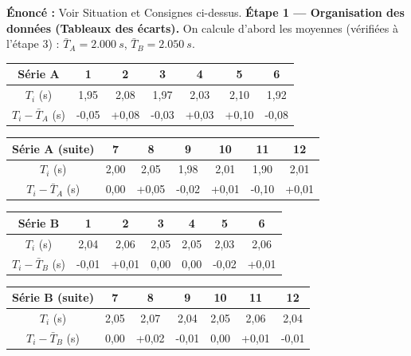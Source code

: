 \documentclass[11pt]{article}
\begin{document}
\begin{exoresolu}
\textbf{Énoncé :} Voir Situation et Consignes ci-dessus.
\tcblower
\textbf{Étape 1 — Organisation des données (Tableaux des écarts).}
On calcule d'abord les moyennes (vérifiées à l'étape 3) : $\bar{T}_A = \SI{2,000}{s}$, $\bar{T}_B = \SI{2,050}{s}$.

\begin{center}
\begin{tabular}{|c|*{6}{c|}}\hline
\rowcolor{popblueL} Série A & 1 & 2 & 3 & 4 & 5 & 6 \\ \hline
$T_i$ (s) & 1,95 & 2,08 & 1,97 & 2,03 & 2,10 & 1,92 \\ \hline
$T_i - \bar{T}_A$ (s) & -0,05 & +0,08 & -0,03 & +0,03 & +0,10 & -0,08 \\ \hline
\end{tabular}
\end{center}
\begin{center}
\begin{tabular}{|c|*{6}{c|}}\hline
\rowcolor{popblueL} Série A (suite) & 7 & 8 & 9 & 10 & 11 & 12 \\ \hline
$T_i$ (s) & 2,00 & 2,05 & 1,98 & 2,01 & 1,90 & 2,01 \\ \hline
$T_i - \bar{T}_A$ (s) & 0,00 & +0,05 & -0,02 & +0,01 & -0,10 & +0,01 \\ \hline
\end{tabular}
\end{center}

\begin{center}
\begin{tabular}{|c|*{6}{c|}}\hline
\rowcolor{popblueL} Série B & 1 & 2 & 3 & 4 & 5 & 6 \\ \hline
$T_i$ (s) & 2,04 & 2,06 & 2,05 & 2,05 & 2,03 & 2,06 \\ \hline
$T_i - \bar{T}_B$ (s) & -0,01 & +0,01 & 0,00 & 0,00 & -0,02 & +0,01 \\ \hline
\end{tabular}
\end{center}
\begin{center}
\begin{tabular}{|c|*{6}{c|}}\hline
\rowcolor{popblueL} Série B (suite) & 7 & 8 & 9 & 10 & 11 & 12 \\ \hline
$T_i$ (s) & 2,05 & 2,07 & 2,04 & 2,05 & 2,06 & 2,04 \\ \hline
$T_i - \bar{T}_B$ (s) & 0,00 & +0,02 & -0,01 & 0,00 & +0,01 & -0,01 \\ \hline
\end{tabular}
\end{center}


\end{exoresolu}
\end{document}
